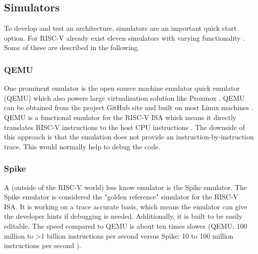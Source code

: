 \subsection{Simulators}
To develop and test an architecture, simulators are
an important quick start option.
For RISC-V already exist eleven simulators with
varying functionality \cite{risc-v_software_status}.
Some of these are described in the following.

\subsubsection{QEMU}
One prominent emulator is the open source machine
emulator quick emulator (QEMU) which also powers
large virtualization solution like Proxmox
\cite{proxmox_qemu_wiki}.
QEMU can be obtained from the project GitHub site
and built on most Linux machines \cite{github_riscv_qemu}.
QEMU is a functional emulator for the RISC-V ISA
which means it directly translates RISC-V instructions
to the host CPU instructions \cite{sifive_risc-v_emulators}.
The downside of this approach is that the emulation does
not provide an instruction-by-instruction trace.
This would normally help to debug the code.

\subsubsection{Spike}
A (outside of the RISC-V world)
less know emulator is the Spike emulator.
The Spike emulator is considered the "golden reference"
simulator \cite{sifive_risc-v_emulators} for the
RISC-V ISA. It is working on a trace accurate
basis, which means the emulator can give the developer
hints if debugging is needed. Additionally, it is built
to be easily editable.
The speed compared
to QEMU is about ten times slower 
(QEMU: 100 million to >1 billion instructions per second
versus Spike: 10 to 100 million instructions per second
\cite{sifive_risc-v_emulators}).

